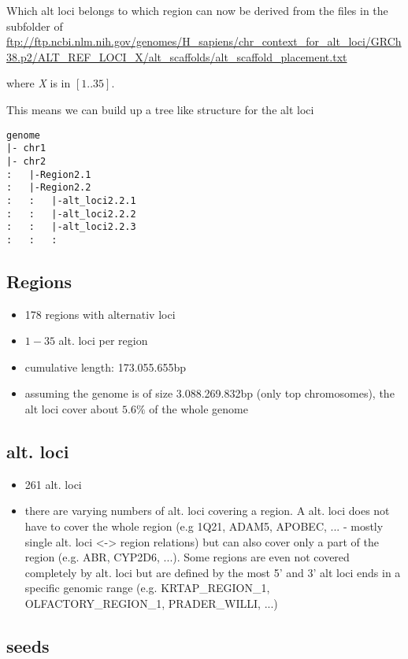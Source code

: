 \documentclass[10pt,a4paper]{article}
\begin{document}
Which alt loci belongs to which region can now be derived from the files in the
subfolder of  \\
\url{ftp://ftp.ncbi.nlm.nih.gov/genomes/H_sapiens/chr_context_for_alt_loci/GRCh38.p2/ALT_REF_LOCI_X/alt_scaffolds/alt_scaffold_placement.txt}

where \textit{X} is in $[1..35]$.

This means we can build up a tree like structure for the alt loci

\begin{verbatim}
genome
|- chr1
|- chr2
:   |-Region2.1
:   |-Region2.2
:   :   |-alt_loci2.2.1
:   :   |-alt_loci2.2.2
:   :   |-alt_loci2.2.3
:   :   :
\end{verbatim}


\subsection*{Regions}

\begin{itemize}
\item 178 regions with alternativ loci
\item $1 - 35$ alt. loci per region
\item cumulative length: 173.055.655bp
\item assuming the genome is of size 3.088.269.832bp (only top chromosomes), the alt loci cover about $5.6\%$ of the whole genome
\end{itemize}

\subsection*{alt. loci}

\begin{itemize}
\item 261 alt. loci
\item there are varying numbers of alt. loci covering a region. A alt. loci does not have to cover the whole region (e.g 1Q21, ADAM5, APOBEC, ... - mostly single alt. loci <-> region relations) but can also cover only a part of the region (e.g. ABR, CYP2D6, ...). Some regions are even not covered completely by alt. loci but are defined by the most 5' and 3' alt loci ends in a specific genomic range (e.g. KRTAP_REGION_1, OLFACTORY_REGION_1, PRADER_WILLI, ...)
\end{itemize}

\subsection*{seeds}
\end{document}
